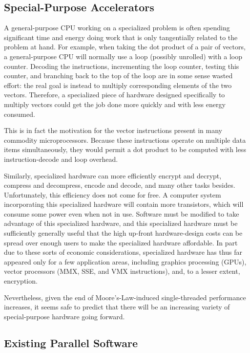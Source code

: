 \subsection{Special-Purpose Accelerators}
\label{sec:cpu:Special-Purpose Accelerators}

A general-purpose CPU working on a specialized problem is often spending
significant time and energy doing work that is only tangentially related
to the problem at hand.
For example, when taking the dot product of a pair of vectors, a
general-purpose CPU will normally use a loop (possibly unrolled)
with a loop counter.
Decoding the instructions, incrementing the loop counter, testing this
counter, and branching back to the
top of the loop are in some sense wasted effort: the real goal is
instead to multiply corresponding elements of the two vectors.
Therefore, a specialized piece of hardware designed specifically to
multiply vectors could get the job done more quickly and with less
energy consumed.

This is in fact the motivation for the vector instructions present in
many commodity microprocessors.
Because these instructions operate on multiple data items simultaneously,
they would permit a dot product to be computed with less instruction-decode
and loop overhead.

Similarly, specialized hardware can more efficiently encrypt and decrypt,
compress and decompress, encode and decode, and many other tasks besides.
Unfortunately, this efficiency does not come for free.
A computer system incorporating this specialized hardware will contain
more transistors, which will consume some power even when not in use.
Software must be modified to take advantage of this specialized hardware,
and this specialized hardware must be sufficiently generally useful
that the high up-front hardware-design costs can be spread over enough
users to make the specialized hardware affordable.
In part due to these sorts of economic considerations, specialized
hardware has thus far appeared only for a few application areas,
including graphics processing (GPUs), vector processors (MMX, SSE,
and VMX instructions), and, to a lesser extent, encryption.

Nevertheless, given the end of Moore's-Law-induced single-threaded
performance increases, it seems safe to predict that there will
be an increasing variety of special-purpose hardware going forward.

\subsection{Existing Parallel Software}
\label{sec:cpu:Existing Parallel Software}

